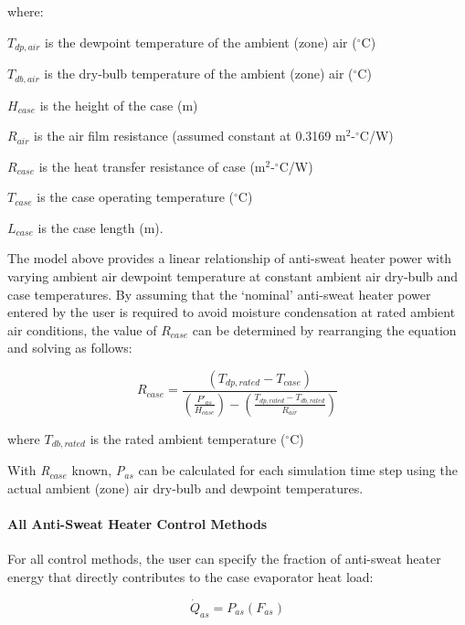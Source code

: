 where:

\({T_{dp,air}}\) is the dewpoint temperature of the ambient (zone) air (\(^{\circ}\)C)

\({T_{db,air}}\) is the dry-bulb temperature of the ambient (zone) air (\(^{\circ}\)C)

\({H_{case}}\) is the height of the case (m)

\({R_{air}}\) is the air film resistance (assumed constant at 0.3169 m\(^{2}\)-\(^{\circ}\)C/W)

\({R_{case}}\) is the heat transfer resistance of case (m\(^{2}\)-\(^{\circ}\)C/W)

\({T_{case}}\) is the case operating temperature (\(^{\circ}\)C)

\({L_{case}}\) is the case length (m).

The model above provides a linear relationship of anti-sweat heater power with varying ambient air dewpoint temperature at constant ambient air dry-bulb and case temperatures. By assuming that the `nominal' anti-sweat heater power entered by the user is required to avoid moisture condensation at rated ambient air conditions, the value of \({R_{case}}\) can be determined by rearranging the equation and solving as follows:

\begin{equation}
{R_{case}} = \frac{{\left( {{T_{dp,rated}} - {T_{case}}} \right)}}{{\left( {\frac{{{P'}_{as}}}{{{H_{case}}}}} \right) - \left( {\frac{{{T_{dp,rated}} - {T_{db,rated}}}}{{{R_{air}}}}} \right)}}
\end{equation}

where \({T_{db,rated}}\) is the rated ambient temperature (\(^{\circ}\)C)

With \emph{R\(_{case}\)} known, \emph{P\(_{as}\)} can be calculated for each simulation time step using the actual ambient (zone) air dry-bulb and dewpoint temperatures.

\paragraph{All Anti-Sweat Heater Control Methods}\label{all-anti-sweat-heater-control-methods}

For all control methods, the user can specify the fraction of anti-sweat heater energy that directly contributes to the case evaporator heat load:

\begin{equation}
{\dot Q_{as}} = {P_{as}}\left( {{F_{as}}} \right)
\end{equation}

